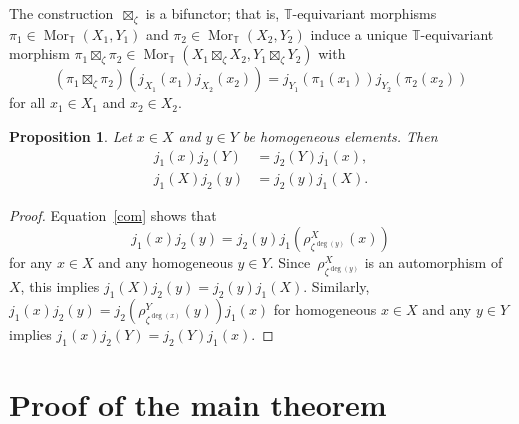 \documentclass[a4paper]{amsart}
\numberwithin{equation}{section}
\newtheorem{Prop}[Thm]{Proposition}
\theoremstyle{definition}
\theoremstyle{remark}
\begin{document}
The construction~\({\boxtimes}_\zeta\) is a bifunctor; that is,
\(\mathbb{T}\){\nobreakdash}-equivariant morphisms
$\pi_1\in{\operatorname{Mor}}_{\mathbb{T}}(X_1,Y_1)$ and
$\pi_2\in{\operatorname{Mor}}_{\mathbb{T}}(X_2,Y_2)$ induce a unique
\(\mathbb{T}\){\nobreakdash}-equivariant morphism
$\pi_1{\boxtimes}_\zeta\pi_2\in{\operatorname{Mor}}_{\mathbb{T}}(X_1{\boxtimes}_\zeta
X_2,Y_1{\boxtimes}_\zeta Y_2)$ with
\begin{equation}
  \label{funct}
  (\pi_1{\boxtimes}_\zeta\pi_2)(j_{X_1}(x_1)j_{X_2}(x_2))
  = j_{Y_1}(\pi_1(x_1))j_{Y_2}(\pi_2(x_2))
\end{equation}
for all $x_1\in X_1$ and $x_2\in X_2$.

\begin{Prop}
  \label{8.44}
  Let $x\in X$ and $y\in Y$ be homogeneous elements.  Then
  \begin{align*}
    j_{1}(x)j_{2}(Y)&= j_{2}(Y)j_{1}(x),\\
    j_{1}(X)j_{2}(y)&= j_{2}(y)j_{1}(X).
  \end{align*}
\end{Prop}

\begin{proof}
  Equation~\eqref{com} shows that
  \[
  j_{1}(x)j_{2}(y)=j_{2}(y)j_{1}(\rho^X_{\zeta^{\deg(y)}}(x))
  \]
  for any $x\in X$ and any homogeneous $y\in Y$.
  Since~\(\rho^X_{\zeta^{\deg(y)}}\) is an automorphism of~\(X\),
  this implies \(j_1(X)j_2(y) = j_2(y) j_1(X)\).  Similarly,
  \(j_{1}(x)j_{2}(y) = j_{2}(\rho^Y_{\zeta^{\deg(x)}}(y))j_{1}(x)\)
  for homogeneous $x\in X$ and any $y\in Y$ implies
  \(j_{1}(x)j_{2}(Y) = j_{2}(Y)j_{1}(x)\).
\end{proof}

\section{Proof of the main theorem}
\end{document}
